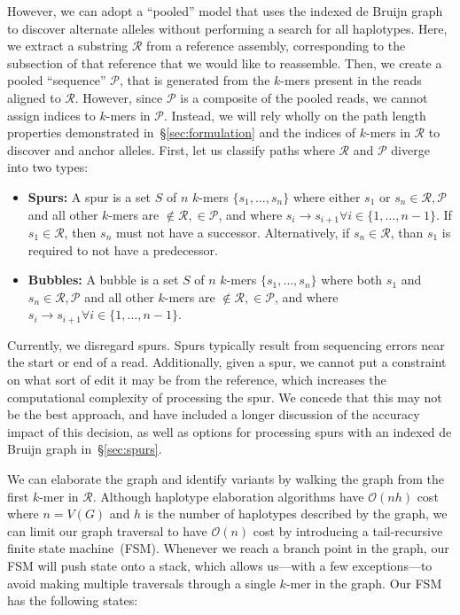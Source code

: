 \documentclass[11pt]{article}
\begin{document}
However, we can adopt a ``pooled'' model that uses the indexed de Bruijn graph to discover alternate
alleles without performing a search for all haplotypes. Here, we extract a substring $\mathcal{R}$ from a
reference assembly, corresponding to the subsection of that reference that we would like to reassemble.
Then, we create a pooled ``sequence'' $\mathcal{P}$, that is generated from the $k$-mers present in
the reads aligned to $\mathcal{R}$. However, since $\mathcal{P}$ is a composite of the pooled reads, we
cannot assign indices to $k$-mers in $\mathcal{P}$. Instead, we will rely wholly on the path length
properties demonstrated in~\S\ref{sec:formulation} and the indices of $k$-mers in $\mathcal{R}$ to
discover and anchor alleles. First, let us classify paths where $\mathcal{R}$ and $\mathcal{P}$ diverge
into two types:

\begin{itemize}
\item \textbf{Spurs:} A spur is a set $S$ of $n$ $k$-mers $\{s_1, \dots, s_n\}$ where either $s_1$ or
$s_n \in \mathcal{R}, \mathcal{P}$ and all other $k$-mers are $\not\in \mathcal{R}, \in \mathcal{P}$,
and where $s_i \rightarrow s_{i + 1} \forall i \in \{1, \dots, n - 1\}$. If $s_1 \in \mathcal{R}$, then $s_n$ must 
not have a successor. Alternatively, if $s_n \in \mathcal{R}$, than $s_1$ is required to not have a
predecessor.
\item \textbf{Bubbles:} A bubble is a set $S$ of $n$ $k$-mers $\{s_1, \dots, s_n\}$ where both $s_1$ and
$s_n \in \mathcal{R}, \mathcal{P}$ and all other $k$-mers are $\not\in \mathcal{R}, \in \mathcal{P}$, and
where $s_i \rightarrow s_{i + 1} \forall i \in \{1, \dots, n - 1\}$.
\end{itemize}

Currently, we disregard spurs. Spurs typically result from sequencing errors near the start or end of a
read. Additionally, given a spur, we cannot put a constraint on what sort of edit it may be from the
reference, which increases the computational complexity of processing the spur. We concede that this
may not be the best approach, and have included a longer discussion of the accuracy impact of this
decision, as well as options for processing spurs with an indexed de Bruijn graph in~\S\ref{sec:spurs}.

We can elaborate the graph and identify variants by walking the graph from the first $k$-mer in
$\mathcal{R}$. Although haplotype elaboration algorithms have $\mathcal{O}(nh)$ cost where
$n = V(G)$ and $h$ is the number of haplotypes described by the graph, we can limit our graph traversal
to have $\mathcal{O}(n)$ cost by introducing a tail-recursive finite state machine~(FSM). Whenever we
reach a branch point in the graph, our FSM will push state onto a stack, which allows us---with a few
exceptions---to avoid making multiple traversals through a single $k$-mer in the graph. Our FSM has
the following states:
\end{document}
